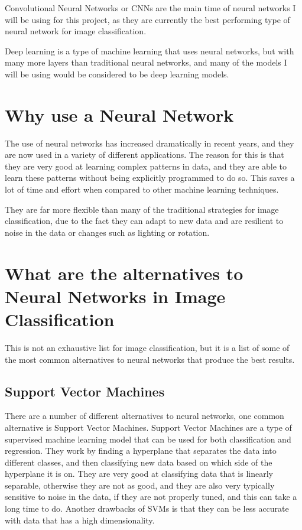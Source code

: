 \documentclass[]{final_report}
\begin{document}
Convolutional Neural Networks or CNNs are the main time of neural networks I will be using for this project, as they are currently the best performing type of neural network for image classification.

Deep learning is a type of machine learning that uses neural networks, but with many more layers than traditional neural networks, and many of the models I will be using would be considered to be deep learning models.

\section{Why use a Neural Network}
The use of neural networks has increased dramatically in recent years, and they are now used in a variety of different applications.
The reason for this is that they are very good at learning complex patterns in data, and they are able to learn
these patterns without being explicitly programmed to do so. This saves a lot of time and effort when compared to other machine learning techniques.

They are far more flexible than many of the traditional strategies for image classification, due to the fact they can adapt to new data and are
resilient to noise in the data or changes such as lighting or rotation.

\pagebreak
\section{What are the alternatives to Neural Networks in Image Classification}

This is not an exhaustive list for image classification, but it is a list of some of the most common alternatives to neural networks
that produce the best results.

\subsection{Support Vector Machines}
There are a number of different alternatives to neural networks, one common alternative is Support Vector Machines.
Support Vector Machines are a type of supervised machine learning model that can be used for both classification and regression.
They work by finding a hyperplane that separates the data into different classes, and then classifying new data based on which side of the hyperplane it is on.
They are very good at classifying data that is linearly separable, otherwise they are not as good, and they are also very typically sensitive to noise in the data, if they are not properly tuned, and this can take a long time to do. Another drawbacks of SVMs is that they can be less accurate with data that has a high dimensionality.
\end{document}

